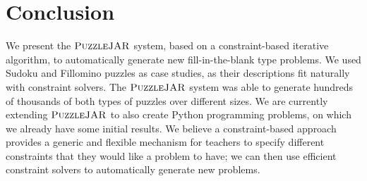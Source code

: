 \section{Conclusion}

We present the $\textsc{PuzzleJAR}$ system, based on a constraint-based
iterative algorithm, to automatically generate new fill-in-the-blank
type problems. We used Sudoku and Fillomino puzzles as case studies,
as their descriptions fit naturally with constraint solvers. The
$\textsc{PuzzleJAR}$ system was able to generate hundreds of thousands of both
types of puzzles over different sizes. We are currently extending
$\textsc{PuzzleJAR}$ to also create Python programming problems, on which we
already have some initial results. We believe a constraint-based
approach provides a generic and flexible mechanism for teachers to
specify different constraints that they would like a problem to have;
we can then use efficient constraint solvers to automatically generate
new problems.
